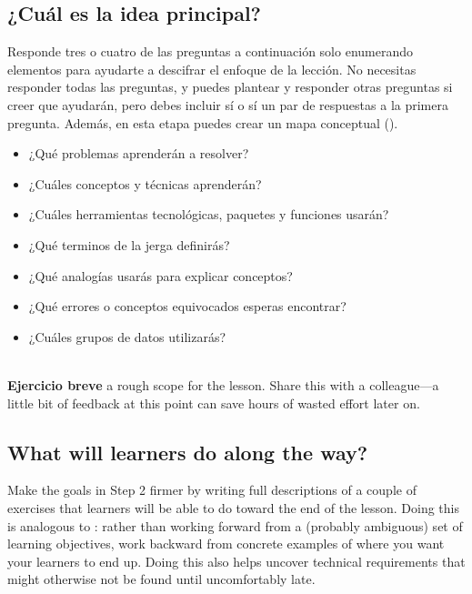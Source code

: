\subsection*{¿Cuál es la idea principal?}

Responde tres o cuatro de las preguntas a continuación solo enumerando elementos
para ayudarte a descifrar el enfoque de la lección.
No necesitas responder todas las preguntas,
y puedes plantear y responder otras preguntas si creer que ayudarán,
pero debes incluir sí o sí un par de respuestas a la primera pregunta.
Además, en esta etapa puedes crear un mapa conceptual ().

\begin{itemize}

\item
  ¿Qué problemas aprenderán a resolver?

\item
  ¿Cuáles conceptos y técnicas aprenderán?

\item
  ¿Cuáles herramientas tecnológicas, paquetes y funciones usarán?

\item
  ¿Qué terminos de la jerga definirás?

\item
  ¿Qué analogías usarás para explicar conceptos?

\item
  ¿Qué errores o conceptos equivocados esperas encontrar?

\item
  ¿Cuáles grupos de datos utilizarás?

\end{itemize}

~\\
\noindent
\textbf{Ejercicio breve}
a rough scope for the lesson.
Share this with a colleague---a little bit of feedback at this point
can save hours of wasted effort later on.

\subsection*{What will learners do along the way?}

Make the goals in Step 2 firmer by writing full descriptions of
a couple of exercises that learners will be able to do toward the end of the lesson.
Doing this is analogous to :
rather than working forward from a (probably ambiguous) set of learning objectives,
work backward from concrete examples of where you want your learners to end up.
Doing this also helps uncover technical requirements
that might otherwise not be found until uncomfortably late.

